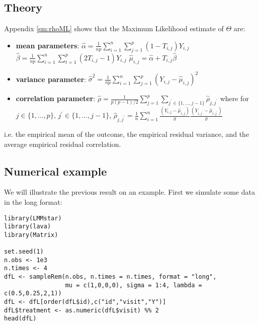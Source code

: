 \documentclass[12pt]{article}
\begin{document}
\subsection{Theory}
\label{sec:orga6c8000}

Appendix \ref{sm:rhoML} shows that the Maximum Likelihood estimate of \(\Theta\) are:
\begin{itemize}
\item \textbf{mean parameters}: \(\widehat{\alpha}= \frac{1}{np} \sum_{i=1}^n
  \sum_{j=1}^p (1-T_{i,j}) Y_{i,j}\) \newline
{} \(\widehat{\beta}=
  \frac{1}{np} \sum_{i=1}^n \sum_{t=1}^p (2 T_{i,j}-1) Y_{i,j}\) \newline
{} \(\widehat{\mu}_{i,j} = \widehat{\alpha} + T_{i,j}\widehat{\beta}\)
\item \textbf{variance parameter}: \(\widehat{\sigma}^2 =
  \frac{1}{np}\sum_{i=1}^n\sum_{j=1}^p (Y_{i,j}-\widehat{\mu}_{i,j})^2\)
\item \textbf{correlation parameter}: \(\widehat{\rho} =
  \frac{1}{p(p-1)/2}\sum_{j=1}^p \sum_{j^{\prime} \in
  \{1,\ldots,j-1\}}\widehat{\rho}_{j,j^{\prime}}\) \newline where for
\(j \in \{1,\ldots,p\}\), \(j^{\prime} \in \{1,\ldots,j-1\}\),
\(\widehat{\rho}_{j,j^{\prime}} = \frac{1}{n}\sum_{i=1}^n
  \frac{(Y_{i,j}-\widehat{\mu}_{i,j})}{\widehat{\sigma}}\frac{(Y_{i,j^{\prime}}-\widehat{\mu}_{i,j^{\prime}})}{\widehat{\sigma}}\)
\end{itemize}
i.e. the empirical mean of the outcome, the empirical residual
variance, and the average empirical residual correlation.

\subsection{Numerical example}
\label{sec:orgc186772}

We will illustrate the previous result on an example. First we
simulate some data in the long format:
\lstset{language=r,label= ,caption= ,captionpos=b,numbers=none}
\begin{lstlisting}
library(LMMstar)
library(lava)
library(Matrix)

set.seed(1)
n.obs <- 1e3
n.times <- 4
dfL <- sampleRem(n.obs, n.times = n.times, format = "long",
                 mu = c(1,0,0,0), sigma = 1:4, lambda = c(0.5,0.25,2,1))
dfL <- dfL[order(dfL$id),c("id","visit","Y")]
dfL$treatment <- as.numeric(dfL$visit) %% 2
head(dfL)
\end{lstlisting}
\end{document}
